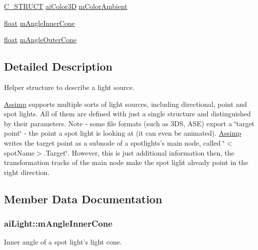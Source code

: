 \begin{DoxyCompactItemize}
\item 
\hyperlink{ai_defines_8h_ab51df4230ceb602bbc1bc109c432a6a0}{C\-\_\-\-S\-T\-R\-U\-C\-T} \hyperlink{structai_color3_d}{ai\-Color3\-D} \hyperlink{structai_light_a5188b60e6fbaf1635fa780913508e3cd}{m\-Color\-Ambient}
\item 
\hyperlink{fmod_8h_aeb841aa4b4b5f444b5d739d865b420af}{float} \hyperlink{structai_light_abad0466811938623e98bf1d334143f9a}{m\-Angle\-Inner\-Cone}
\item 
\hyperlink{fmod_8h_aeb841aa4b4b5f444b5d739d865b420af}{float} \hyperlink{structai_light_a20fd332a5f9d8e8cb94816ff2b0ae7f4}{m\-Angle\-Outer\-Cone}
\end{DoxyCompactItemize}


\subsection{Detailed Description}
Helper structure to describe a light source.

\hyperlink{namespace_assimp}{Assimp} supports multiple sorts of light sources, including directional, point and spot lights. All of them are defined with just a single structure and distinguished by their parameters. Note -\/ some file formats (such as 3\-D\-S, A\-S\-E) export a \char`\"{}target point\char`\"{} -\/ the point a spot light is looking at (it can even be animated). \hyperlink{namespace_assimp}{Assimp} writes the target point as a subnode of a spotlights's main node, called \char`\"{}$<$spot\-Name$>$.\-Target\char`\"{}. However, this is just additional information then, the transformation tracks of the main node make the spot light already point in the right direction. 

\subsection{Member Data Documentation}
\hypertarget{structai_light_abad0466811938623e98bf1d334143f9a}{
\subsubsection[{m\-Angle\-Inner\-Cone}]{ ai\-Light\-::m\-Angle\-Inner\-Cone}}\label{structai_light_abad0466811938623e98bf1d334143f9a}
Inner angle of a spot light's light cone.

